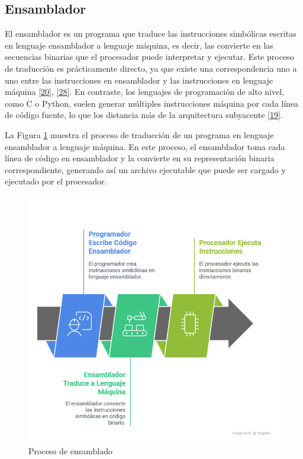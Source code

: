 \documentclass[12pt,oneside]{templates/unerthesis}
\begin{document}
\hypertarget{ensamblador}{%
\subsection{Ensamblador}\label{ensamblador}}

El ensamblador es un programa que traduce las instrucciones simbólicas escritas en lenguaje ensamblador a lenguaje máquina, es decir, las convierte en las secuencias binarias que el procesador puede interpretar y ejecutar. Este proceso de traducción es prácticamente directo, ya que existe una correspondencia uno a uno entre las instrucciones en ensamblador y las instrucciones en lenguaje máquina \protect\hyperlink{ref-stallings_computer_2021}{{[}20{]}}, \protect\hyperlink{ref-tanenbaum_structured_2016}{{[}28{]}}. En contraste, los lenguajes de programación de alto nivel, como C o Python, suelen generar múltiples instrucciones máquina por cada línea de código fuente, lo que los distancia más de la arquitectura subyacente \protect\hyperlink{ref-hennessy2017computer}{{[}19{]}}.

La Figura \ref{fig:ensambla} muestra el proceso de traducción de un programa en lenguaje ensamblador a lenguaje máquina. En este proceso, el ensamblador toma cada línea de código en ensamblador y la convierte en su representación binaria correspondiente, generando así un archivo ejecutable que puede ser cargado y ejecutado por el procesador.

\begin{figure}

{\centering \includegraphics[width=1\linewidth]{images/ensamblador} 

}

\caption{Proceso de ensamblado}\label{fig:ensambla}
\end{figure}
\end{document}
